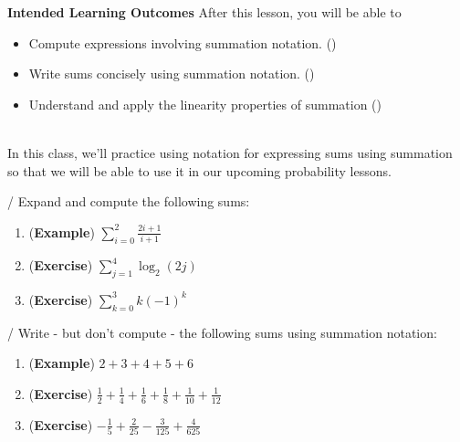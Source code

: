 \documentclass[10pt]{article}
\begin{document}
\pagestyle{otherpages}
\thispagestyle{firstpage}

\textbf{Intended Learning Outcomes}
After this lesson, you will be able to 

\begin{itemize}
    \item Compute expressions involving summation notation. ()
    \item Write sums concisely using summation notation. ()
    \item Understand and apply the linearity properties of summation ()
\end{itemize}

\vspace{-0.6cm}

\hrulefill\\

In this class, we'll practice using notation for expressing sums using summation so that we will be able to use it in our upcoming probability lessons.

{\example / \exercise} Expand and compute the following sums:
    \begin{enumerate}
    \item[(a)] ({\bf\color{blue}Example}) $\displaystyle\sum_{i=0}^2 \frac{2i+1}{i+1}$
        \vfill
    \item[(b)] ({\bf\color{blue}Exercise}) $\displaystyle\sum_{j=1}^4 \log_2\left( 2j\right)$
        \vfill
    \item[(c)] ({\bf\color{blue}Exercise}) $\displaystyle\sum_{k=0}^3 k(-1)^k$
        \vfill
    \end{enumerate}
    
{\example / \exercise} Write - but don't compute - the following sums using summation notation:
    \begin{enumerate}
    \item[(a)] ({\bf\color{blue}Example}) $2+3+4+5+6$
        \vfill
    \item[(b)] ({\bf\color{blue}Exercise}) $\displaystyle\frac12+\frac14+\frac16+\frac18+\frac1{10}+\frac1{12}$
        \vfill
    \item[(c)] ({\bf\color{blue}Exercise}) $\displaystyle-\frac15+\frac2{25}-\frac3{125}+\frac4{625}$
        \vfill
    \end{enumerate}
    
\end{document}
